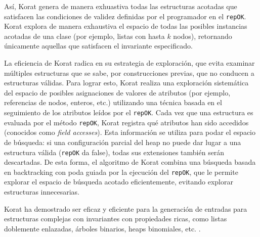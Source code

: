Así, Korat genera de manera exhuastiva todas las estructuras acotadas que
satisfacen las condiciones de validez definidas por el programador en el
\texttt{repOK}. 
Korat explora de manera exhaustiva el espacio de todas las posibles instancias
acotadas de una clase (por ejemplo, listas con hasta $k$ nodos), 
retornando únicamente aquellas que satisfacen el invariante especificado. 

La eficiencia de Korat radica en su estrategia de exploración, 
que evita examinar múltiples estructuras que se sabe, por construcciones previas, que no conducen a estructuras válidas. 
Para lograr esto, Korat realiza una exploración sistemática del espacio de
posibles asignaciones de valores de atributos (por ejemplo, referencias de
nodos, enteros, etc.) utilizando una técnica basada en el seguimiento de los
atributos  leídos por el \texttt{repOK}.
Cada vez que una estructura es evaluada por el método \texttt{repOK}, Korat
registra qué atributos han sido accedidos (conocidos como \emph{field
accesses}). Esta información se utiliza para podar el espacio de búsqueda: si
una configuración parcial del heap no puede dar lugar a una estructura válida
(\texttt{repOK} da false), todas sus extensiones también serán descartadas.
De esta forma, el algoritmo de Korat combina una búsqueda basada en backtracking con poda
guiada por la ejecución del \texttt{repOK}, que le permite explorar 
el espacio de búsqueda acotado eficientemente, evitando explorar estructuras innecesarias. 

Korat ha demostrado ser eficaz y eficiente para la generación de entradas para
estructuras complejas con invariantes con propiedades ricas, como
listas doblemente enlazadas, árboles binarios, heaps binomiales, etc. \cite{} .









